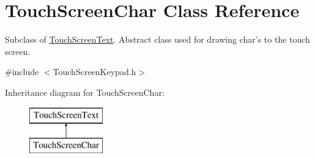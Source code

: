 \hypertarget{class_touch_screen_char}{\section{Touch\+Screen\+Char Class Reference}
\label{class_touch_screen_char}
}


Subclass of \hyperlink{class_touch_screen_text}{Touch\+Screen\+Text}. Abstract class used for drawing char's to the touch screen.  




{\ttfamily \#include $<$Touch\+Screen\+Keypad.\+h$>$}

Inheritance diagram for Touch\+Screen\+Char\+:\begin{figure}[H]
\begin{center}
\leavevmode
\includegraphics[height=2.000000cm]{class_touch_screen_char}
\end{center}
\end{figure}
